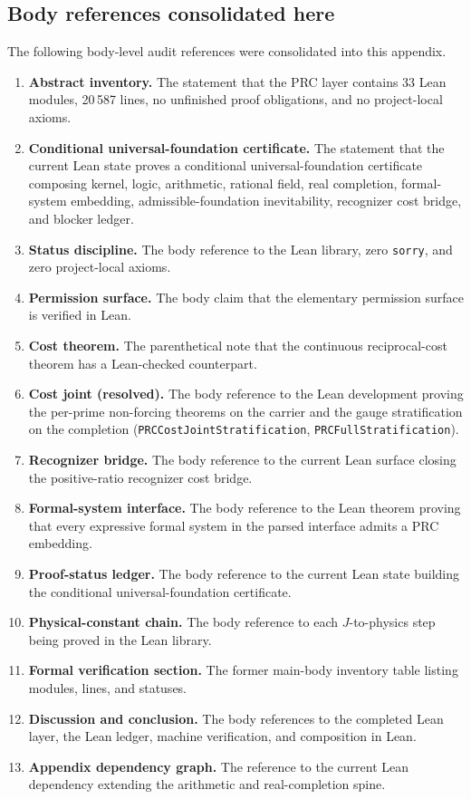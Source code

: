 \documentclass[11pt,a4paper]{article}
\theoremstyle{definition}
\theoremstyle{remark}
\begin{document}
\subsection{Body references consolidated here}

The following body-level audit references were consolidated into this
appendix.

\begin{enumerate}[leftmargin=2em]
  \item \textbf{Abstract inventory.} The statement that the PRC layer contains
    33 Lean modules, 20\,587 lines, no unfinished proof obligations, and no
    project-local axioms.
  \item \textbf{Conditional universal-foundation certificate.} The statement
    that the current Lean state proves a conditional universal-foundation
    certificate composing kernel, logic, arithmetic, rational field, real
    completion, formal-system embedding, admissible-foundation inevitability,
    recognizer cost bridge, and blocker ledger.
  \item \textbf{Status discipline.} The body reference to the Lean library,
    zero \texttt{sorry}, and zero project-local axioms.
  \item \textbf{Permission surface.} The body claim that the elementary
    permission surface is verified in Lean.
  \item \textbf{Cost theorem.} The parenthetical note that the continuous
    reciprocal-cost theorem has a Lean-checked counterpart.
  \item \textbf{Cost joint (resolved).} The body reference to the Lean
    development proving the per-prime non-forcing theorems on the carrier and
    the gauge stratification on the completion
    (\texttt{PRCCostJointStratification}, \texttt{PRCFullStratification}).
  \item \textbf{Recognizer bridge.} The body reference to the current Lean
    surface closing the positive-ratio recognizer cost bridge.
  \item \textbf{Formal-system interface.} The body reference to the Lean
    theorem proving that every expressive formal system in the parsed
    interface admits a PRC embedding.
  \item \textbf{Proof-status ledger.} The body reference to the current Lean
    state building the conditional universal-foundation certificate.
  \item \textbf{Physical-constant chain.} The body reference to each
    $J$-to-physics step being proved in the Lean library.
  \item \textbf{Formal verification section.} The former main-body inventory
    table listing modules, lines, and statuses.
  \item \textbf{Discussion and conclusion.} The body references to the
    completed Lean layer, the Lean ledger, machine verification, and composition
    in Lean.
  \item \textbf{Appendix dependency graph.} The reference to the current Lean
    dependency extending the arithmetic and real-completion spine.
\end{enumerate}
\end{document}
